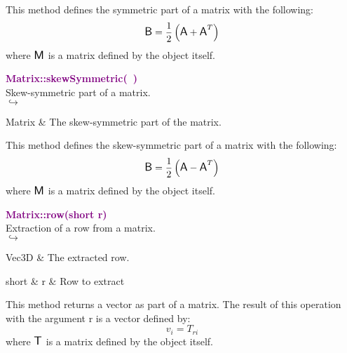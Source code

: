 This method defines the symmetric part of a matrix with the following:
\begin{equation*}
\mbox{\large\ensuremath{\mathsf{B}}} = \frac{1}{2} \left( \mbox{\large\ensuremath{\mathsf{A}}} + \mbox{\large\ensuremath{\mathsf{A}}}^T \right)
\end{equation*}
where $\mbox{\large\ensuremath{\mathsf{M}}}$ is a matrix defined by the object itself.

\textcolor{purple}{\textbf{Matrix::skewSymmetric(~)}}\label{Matrix::skewSymmetric()}\\
Skew-symmetric part of a matrix.\\ \hspace*{5mm}$\hookrightarrow$
\vspace*{-2em}\begin{tcolorbox}[grow to left by=-1cm, width=\textwidth-1cm,myArgs,tabularx={l|R}]
Matrix & The skew-symmetric part of the matrix.
\end{tcolorbox}

This method defines the skew-symmetric part of a matrix with the following:
\begin{equation*}
\mbox{\large\ensuremath{\mathsf{B}}} = \frac{1}{2} \left( \mbox{\large\ensuremath{\mathsf{A}}} - \mbox{\large\ensuremath{\mathsf{A}}}^T \right)
\end{equation*}
where $\mbox{\large\ensuremath{\mathsf{M}}}$ is a matrix defined by the object itself.

\textcolor{purple}{\textbf{Matrix::row(short r)}}\label{Matrix::row(short r)}\\
Extraction of a row from a matrix.\\ \hspace*{5mm}$\hookrightarrow$
\vspace*{-2em}\begin{tcolorbox}[grow to left by=-1cm, width=\textwidth-1cm,myArgs,tabularx={l|R}]
Vec3D & The extracted row.
\end{tcolorbox}

\begin{tcolorbox}[width=\textwidth,myArgs,tabularx={ll|R}]
short & r & Row to extract
\end{tcolorbox}

This method returns a vector as part of a matrix.
The result of this operation with the argument r is a vector defined by:
\begin{equation*}
v_{i} = T_{ri}
\end{equation*}
where $\mbox{\large\ensuremath{\mathsf{T}}}$ is a matrix defined by the object itself.


